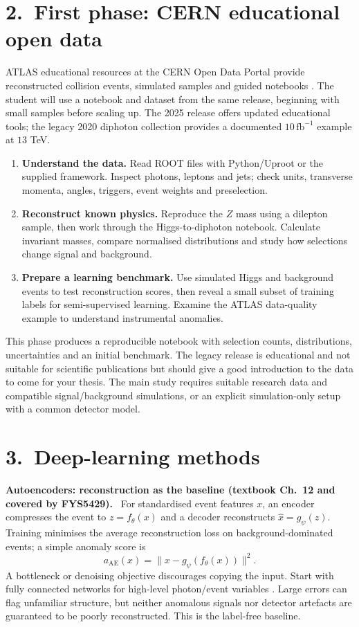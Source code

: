 \documentclass[11pt,a4paper]{article}
\newcommand{\lead}[1]{\textbf{#1}\ }
\begin{document}
\section{2.\ First phase: CERN educational open data}
ATLAS educational resources at the CERN Open Data Portal provide reconstructed collision events, simulated samples and guided notebooks \cite{data}. The student will use a notebook and dataset from the same release, beginning with small samples before scaling up. The 2025 release offers updated educational tools; the legacy 2020 diphoton collection provides a documented $10\,\mathrm{fb}^{-1}$ example at $13$ TeV.
\begin{enumerate}
\item \textbf{Understand the data.} Read ROOT files with Python/Uproot or the supplied framework. Inspect photons, leptons and jets; check units, transverse momenta, angles, triggers, event weights and preselection.
\item \textbf{Reconstruct known physics.} Reproduce the $Z$ mass using a dilepton sample, then work through the Higgs-to-diphoton notebook. Calculate invariant masses, compare normalised distributions and study how selections change signal and background.
\item \textbf{Prepare a learning benchmark.} Use simulated Higgs and background events to test reconstruction scores, then reveal a small subset of training labels for semi-supervised learning. Examine the ATLAS data-quality example to understand instrumental anomalies.
\end{enumerate}

This phase produces a reproducible notebook with selection counts,
distributions, uncertainties and an initial benchmark. The legacy
release is educational and not suitable for scientific publications but should give a good introduction to the data to come for your thesis. The
main study requires suitable research data and compatible
signal/background simulations, or an explicit simulation-only setup
with a common detector model.

\section{3.\ Deep-learning methods}
\lead{Autoencoders: reconstruction as the baseline (textbook Ch.~12 and covered by FYS5429).}
For standardised event features $x$, an encoder compresses the event to $z=f_\theta(x)$ and a decoder reconstructs $\hat{x}=g_\psi(z)$. Training minimises the average reconstruction loss on background-dominated events; a simple anomaly score is
\[
 a_{\mathrm{AE}}(x)=\|x-g_\psi(f_\theta(x))\|^2 .
\]
A bottleneck or denoising objective discourages copying the input. Start with fully connected networks for high-level photon/event variables \cite{ae}. Large errors can flag unfamiliar structure, but neither anomalous signals nor detector artefacts are guaranteed to be poorly reconstructed. This is the label-free baseline.
\end{document}
